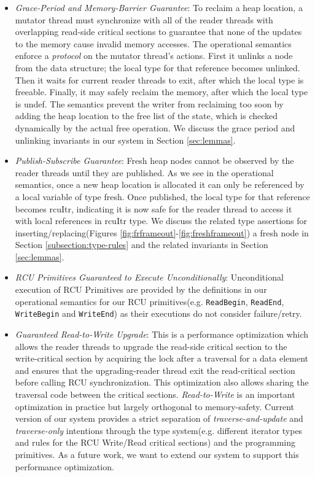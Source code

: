 \begin{itemize}
  \item \textit{Grace-Period and Memory-Barrier Guarantee}: To reclaim a heap location, a mutator thread must synchronize with all of the reader threads with overlapping read-side critical sections to guarantee that none of the updates to the memory cause invalid memory accesses.
The operational semantics enforce a \textit{protocol} on the mutator thread's actions. First it unlinks a node from the data structure; the local type for that reference becomes \textsf{unlinked}. Then it waits for current reader threads to exit, after which the local type is \textsf{freeable}. Finally, it may safely reclaim the memory, after which the local type is \textsf{undef}.
The semantics prevent the writer from reclaiming too soon by adding the heap location to the free list of the state, which is checked dynamically by the actual free operation. We discuss the grace period and unlinking invariants in our system in Section \ref{sec:lemmas}.
\item \textit{Publish-Subscribe Guarantee}: Fresh heap nodes cannot be observed by the reader threads until they are published. As we see in the operational semantics, once a new heap location is allocated it can only be referenced by a local variable of type \textsf{fresh}. Once published, the local type for that reference becomes \textsf{rcuItr}, indicating it is now safe for the reader thread to access it with local references in \textsf{rcuItr} type. We discuss the related type assertions for inserting/replacing(Figures \ref{fig:frframeout}-\ref{fig:freshframeout}) a fresh node in Section \ref{subsection:type-rules} and the related invariants in Section \ref{sec:lemmas}.
\item \textit{RCU Primitives Guaranteed to Execute Unconditionally}: Unconditional execution of RCU Primitives are provided by the definitions in our operational semantics for our RCU primitives(e.g. \lstinline|ReadBegin|, \lstinline|ReadEnd|, \lstinline|WriteBegin| and \lstinline|WriteEnd|) as their executions do not consider failure/retry.
\item \textit{Guaranteed Read-to-Write Upgrade}: This is a performance optimization which allows the reader threads to upgrade the read-side critical section to the write-critical section by acquiring the lock after a traversal for a data element and ensures that the upgrading-reader thread exit the read-critical section before calling RCU synchronization. This optimization also allows sharing the traversal code between the critical sections. \textit{Read-to-Write} is an important optimization in practice but largely orthogonal to memory-safety. Current version of our system provides a strict separation of \textit{traverse-and-update} and \textit{traverse-only} intentions through the type system(e.g. different iterator types and rules for the RCU Write/Read critical sections) and the programming primitives. As a future work, we want to extend our system to support this performance optimization.
\end{itemize}

